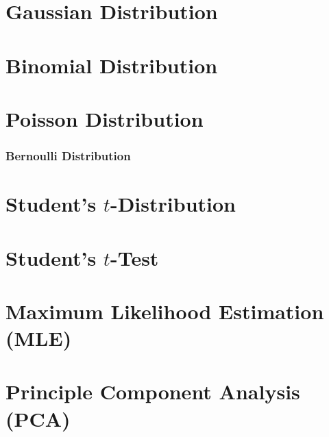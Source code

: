 \section{Gaussian Distribution}
\label{stats:gaus}

\section{Binomial Distribution}
\label{stats:binomial}

\section{Poisson Distribution}
\label{stats:poisson}

\subsubsection{Bernoulli Distribution}
\label{stats:poisson:bernoulli}

\section{Student's \texorpdfstring{$t$}{t}-Distribution}
\label{stats:t_dist}

\section{Student's \texorpdfstring{$t$}{t}-Test}
\label{stats:t_test}

\section{Maximum Likelihood Estimation (MLE)}
\label{stats:MLE}


\section{Principle Component Analysis (PCA)}
\label{stats:PCA}

